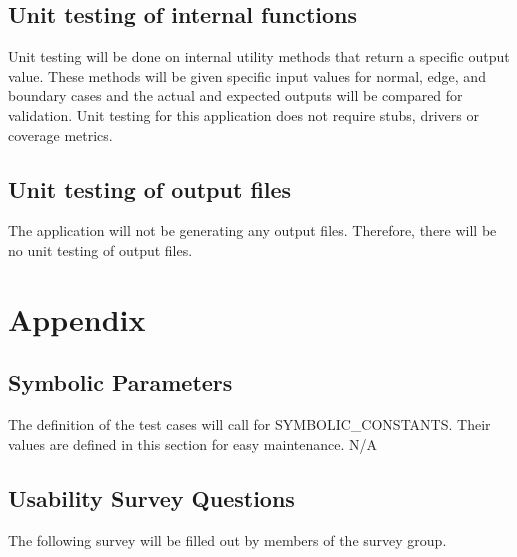\documentclass[12pt, titlepage]{article}
\begin{document}
\subsection{Unit testing of internal functions}
Unit testing will be done on internal utility methods that return a specific output value. These methods will be given specific input values for normal, edge, and boundary cases and the actual and expected outputs will be compared for validation. Unit testing for this application does not require stubs, drivers or coverage metrics. 
		
\subsection{Unit testing of output files}	The application will not be generating any output files. Therefore, there will be no unit testing of output files.

\section{Appendix}

\subsection{Symbolic Parameters}

The definition of the test cases will call for SYMBOLIC\_CONSTANTS.
Their values are defined in this section for easy maintenance.
N/A

\newpage

\subsection{Usability Survey Questions}

\label{sec:survey}
The following survey will be filled out by members of the survey group.
\end{document}
